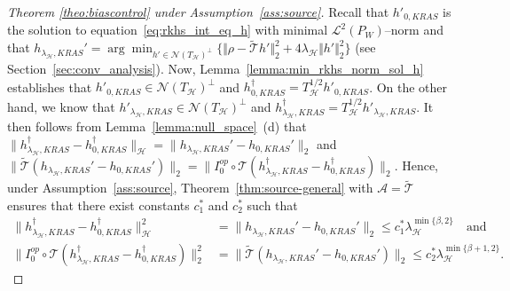 \documentclass[twoside,11pt]{article}
\newcommand{\mc}{\mathcal}
\begin{document}
\begin{proof}[Theorem \ref{theo:biascontrol} under Assumption~\ref{ass:source}]
Recall that $h'_{0,KRAS}$ is the solution to equation~\eqref{eq:rkhs_int_eq_h} with minimal $\mc{L}^2(P_W)$--norm and that $h_{\lambda_\mc{H},KRAS}'=\arg\min_{h'\in\mathcal{N}(T_\mc{H})^\perp}\{\Vert\rho -\widetilde{\mc{T}}h'\Vert_2^2+4\lambda_{\mc{H}}\Vert h'\Vert_2^2\}$ (see Section~\ref{sec:conv_analysis}). 
Now, Lemma~\ref{lemma:min_rkhs_norm_sol_h} establishes that $h'_{0,KRAS}\in \mc{N}(T_\mc{H})^\perp$ and $h^\dag_{0,KRAS}=T_\mc{H}^{1/2}h'_{0,KRAS}$. On the other hand, we know that 
$h'_{\lambda_\mc{H},KRAS}\in \mc{N}(T_\mc{H})^\perp$ and $h^\dag_{\lambda_\mc{H},KRAS}=T_\mc{H}^{1/2}h'_{\lambda_\mc{H},KRAS}$. It then follows from Lemma~\ref{lemma:null_space}~(d) that $\|h_{\lambda_\mc{H},KRAS}^\dag - h_{0,KRAS}^\dag\|_\mc{H} = \|h_{\lambda_\mc{H},KRAS}' - h_{0,KRAS}'\|_2$ and $\|\widetilde{\mc{T}}(h_{\lambda_\mc{H},KRAS}'-h_{0,KRAS}')\|_2 = \|I_0^{op}\circ\mc{T}(h_{\lambda_\mc{H},KRAS}^\dag - h_{0,KRAS}^\dag)\|_2$.  
Hence, under Assumption~\ref{ass:source}, Theorem~\ref{thm:source-general} with $\mc{A}=\widetilde{\mc{T}}$ ensures that there exist constants $c_1^*$ and $c_2^*$ such that
\begin{align*}
\|h_{\lambda_\mc{H},KRAS}^\dag - h_{0,KRAS}^\dag\|_\mc{H}^2&=\|h_{\lambda_\mc{H},KRAS}' - h_{0,KRAS}'\|_2 \le c_1^*\lambda_\mc{H}^{\min\{\beta,2\}}\quad\text{and}\\
\|I_0^{op}\circ\mc{T}(h_{\lambda_\mc{H},KRAS}^\dag - h_{0,KRAS}^\dag)\|_2^2&=\|\widetilde{\mc{T}}(h_{\lambda_\mc{H},KRAS}'-h_{0,KRAS}')\|_2 \le c_2^*\lambda_\mc{H}^{\min\{\beta+1,2\}}.
\end{align*}
\end{proof}
\end{document}
